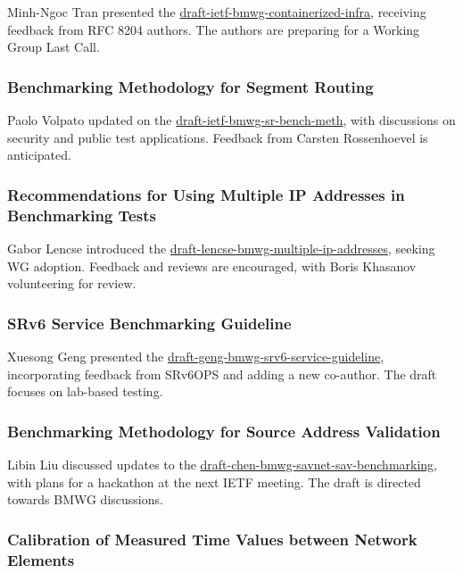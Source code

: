 \documentclass{article}
\begin{document}
Minh-Ngoc Tran presented the \href{https://datatracker.ietf.org/doc/html/draft-ietf-bmwg-containerized-infra}{draft-ietf-bmwg-containerized-infra}, receiving feedback from RFC 8204 authors. The authors are preparing for a Working Group Last Call.

\subsubsection{Benchmarking Methodology for Segment Routing}

Paolo Volpato updated on the \href{https://datatracker.ietf.org/doc/html/draft-ietf-bmwg-sr-bench-meth}{draft-ietf-bmwg-sr-bench-meth}, with discussions on security and public test applications. Feedback from Carsten Rossenhoevel is anticipated.

\subsubsection{Recommendations for Using Multiple IP Addresses in Benchmarking Tests}

Gabor Lencse introduced the \href{https://datatracker.ietf.org/doc/html/draft-lencse-bmwg-multiple-ip-addresses}{draft-lencse-bmwg-multiple-ip-addresses}, seeking WG adoption. Feedback and reviews are encouraged, with Boris Khasanov volunteering for review.

\subsubsection{SRv6 Service Benchmarking Guideline}

Xuesong Geng presented the \href{https://datatracker.ietf.org/doc/html/draft-geng-bmwg-srv6-service-guideline}{draft-geng-bmwg-srv6-service-guideline}, incorporating feedback from SRv6OPS and adding a new co-author. The draft focuses on lab-based testing.

\subsubsection{Benchmarking Methodology for Source Address Validation}

Libin Liu discussed updates to the \href{https://datatracker.ietf.org/doc/html/draft-chen-bmwg-savnet-sav-benchmarking}{draft-chen-bmwg-savnet-sav-benchmarking}, with plans for a hackathon at the next IETF meeting. The draft is directed towards BMWG discussions.

\subsubsection{Calibration of Measured Time Values between Network Elements}
\end{document}
